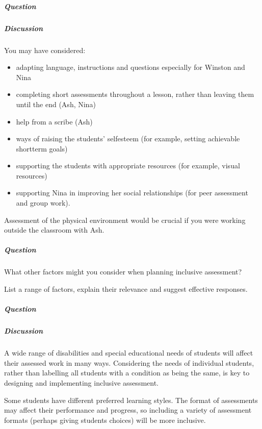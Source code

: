 \documentclass[letterpaper,10pt,english]{sphinxmanual}
\begin{document}
\subparagraph{Question}
\label{\detokenize{content/session_00/Part_00_04:id6}}

\subparagraph{Discussion}
\label{\detokenize{content/session_00/Part_00_04:id7}}
You may have considered:
\begin{itemize}
\item {} 
adapting language, instructions and questions especially for Winston and Nina

\item {} 
completing short assessments throughout a lesson, rather than leaving them until the end (Ash, Nina)

\item {} 
help from a scribe (Ash)

\item {} 
ways of raising the students’ self\sphinxhyphen{}esteem (for example, setting achievable short\sphinxhyphen{}term goals)

\item {} 
supporting the students with appropriate resources (for example, visual resources)

\item {} 
supporting Nina in improving her social relationships (for peer assessment and group work).

\end{itemize}

Assessment of the physical environment would be crucial if you were working outside the classroom with Ash.


\subparagraph{Question}
\label{\detokenize{content/session_00/Part_00_04:id8}}
What other factors might you consider when planning inclusive assessment?

List a range of factors, explain their relevance and suggest effective responses.


\subparagraph{Question}
\label{\detokenize{content/session_00/Part_00_04:id9}}

\subparagraph{Discussion}
\label{\detokenize{content/session_00/Part_00_04:id10}}
A wide range of disabilities and special educational needs of students will affect their assessed work in many ways. Considering the needs of individual students, rather than labelling all students with a condition as being the same, is key to designing and implementing inclusive assessment.

Some students have different preferred learning styles. The format of assessments may affect their performance and progress, so including a variety of assessment formats (perhaps giving students choices) will be more inclusive.
\end{document}
